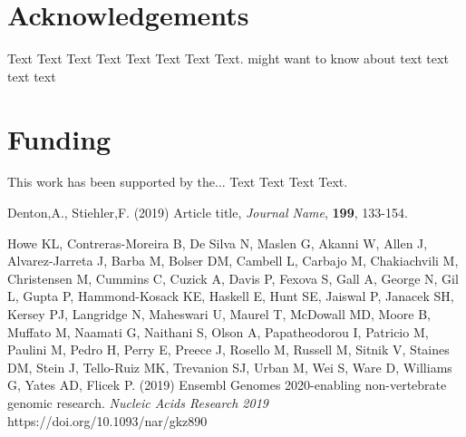 \documentclass{bioinfo}
\begin{document}
\section*{Acknowledgements}

Text Text Text Text Text Text  Text Text.  \citealp{Boffelli03} might want to know about  text
text text text\vspace*{-12pt}

\section*{Funding}

This work has been supported by the... Text Text  Text Text.\vspace*{-12pt}

%
%
%
%
%
%
%
%
%


\begin{thebibliography}{}

Denton,A., Stiehler,F. (2019) Article title, {\it Journal Name}, {\bf 199}, 133-154.

Howe KL, Contreras-Moreira B, De Silva N, Maslen G, Akanni W, Allen J, Alvarez-Jarreta J, Barba M, Bolser DM, Cambell L, Carbajo M, Chakiachvili M, Christensen M, Cummins C, Cuzick A, Davis P, Fexova S, Gall A, George N, Gil L, Gupta P, Hammond-Kosack KE, Haskell E, Hunt SE, Jaiswal P, Janacek SH, Kersey PJ, Langridge N, Maheswari U, Maurel T, McDowall MD, Moore B, Muffato M, Naamati G, Naithani S, Olson A, Papatheodorou I, Patricio M, Paulini M, Pedro H, Perry E, Preece J, Rosello M, Russell M, Sitnik V, Staines DM, Stein J, Tello-Ruiz MK, Trevanion SJ, Urban M, Wei S, Ware D, Williams G, Yates AD, Flicek P. (2019) Ensembl Genomes 2020-enabling non-vertebrate genomic research. {\it Nucleic Acids Research 2019} https://doi.org/10.1093/nar/gkz890

\end{thebibliography}
\end{document}
